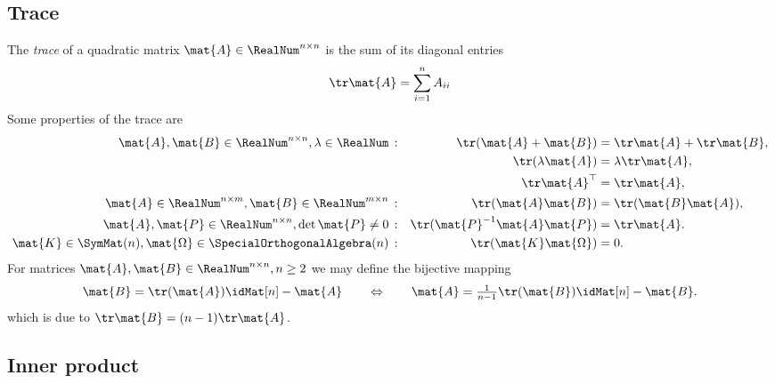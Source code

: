 \subsection{Trace}
The \textit{trace} of a quadratic matrix $\mat{A} \in \RealNum^{n\times n}$ is the sum of its diagonal entries
\begin{align}
 \tr \mat{A} = \sum_{i=1}^{n} A_{ii}
\end{align}
Some properties of the trace are
\begin{subequations}
\begin{align}
 \mat{A}, \mat{B} \in \RealNum^{n\times n}, \lambda\in\RealNum \,&:&
 \tr(\mat{A}+\mat{B}) &= \tr\mat{A} + \tr\mat{B},
\\
 &&
 \tr(\lambda \mat{A}) &= \lambda \tr\mat{A},
\\
 &&
 \tr \mat{A}^\top &= \tr \mat{A},
\\ 
 \mat{A} \in \RealNum^{n\times m}, \mat{B}\in\RealNum^{m\times n}\,&:&
 \tr(\mat{A}\mat{B}) &= \tr(\mat{B}\mat{A}),
\\ 
 \mat{A}, \mat{P} \in \RealNum^{n\times n}, \det\mat{P} \neq 0\,&:&
 \tr(\mat{P}^{-1} \mat{A} \mat{P}) &= \tr\mat{A}.
\\
 \mat{K}\in\SymMat(n), \mat{\Omega}\in\SpecialOrthogonalAlgebra(n)\,&:&
 \tr(\mat{K}\mat{\Omega}) &= 0.
\end{align}
\end{subequations}
For matrices $\mat{A},\mat{B}\in \RealNum^{n\times n}, n\geq2$ we may define the bijective mapping
\begin{align}
 \mat{B} = \tr(\mat{A})\idMat[n] - \mat{A}
\qquad \Leftrightarrow \qquad
 \mat{A} = \tfrac{1}{n-1}\tr(\mat{B}) \idMat[n] - \mat{B}.
\end{align}
which is due to $\tr\mat{B} = (n-1)\tr\mat{A}$.


\subsection{Inner product}\label{sec:MathInnerProduct}
